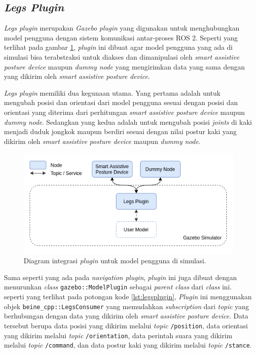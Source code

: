 \subsection{\emph{Legs Plugin}}
\label{subsec:legsplugin}

\emph{Legs plugin} merupakan \emph{Gazebo plugin} yang digunakan untuk menghubungkan model pengguna dengan sistem komunikasi antar-proses ROS 2.
Seperti yang terlihat pada gambar \ref{fig:integrasipluginpengguna},
  \emph{plugin} ini dibuat agar model pengguna yang ada di simulasi bisa terabstraksi untuk diakses dan dimanipulasi oleh \emph{smart assistive posture device} maupun \emph{dummy node} yang mengirimkan data yang sama dengan yang dikirim oleh \emph{smart assistive posture device}.

\emph{Legs plugin} memiliki dua kegunaan utama.
Yang pertama adalah untuk mengubah posisi dan orientasi dari model pengguna sesuai dengan posisi dan orientasi yang diterima dari perhitungan \emph{smart assistive posture device} maupun \emph{dummy node}.
Sedangkan yang kedua adalah untuk mengubah posisi \emph{joints} di kaki menjadi duduk jongkok maupun berdiri sesuai dengan nilai postur kaki yang dikirim oleh \emph{smart assistive posture device} maupun \emph{dummy node}.

\begin{figure}[ht]
  \centering
  \includegraphics[scale=0.5]{gambar/integrasi-plugin-pengguna.png}
  \caption{Diagram integrasi \emph{plugin} untuk model pengguna di simulasi.}
  \label{fig:integrasipluginpengguna}
\end{figure}



Sama seperti yang ada pada \emph{navigation plugin},
  \emph{plugin} ini juga dibuat dengan menurunkan \emph{class} \lstinline{gazebo::ModelPlugin} sebagai \emph{parent class} dari \emph{class} ini.
seperti yang terlihat pada potongan kode \ref{lst:legsplugin},
  \emph{Plugin} ini menggunakan objek \lstinline{beine_cpp::LegsConsumer} yang memudahkan \emph{subscription} dari \emph{topic} yang berhubungan dengan data yang dikirim oleh \emph{smart assistive posture device}.
Data tersebut berupa data posisi yang dikirim melalui \emph{topic} \lstinline{/position},
  data orientasi yang dikirim melalui \emph{topic} \lstinline{/orientation},
  data perintah suara yang dikirim melalui \emph{topic} \lstinline{/command},
  dan data postur kaki yang dikirim melalui \emph{topic} \lstinline{/stance}.

